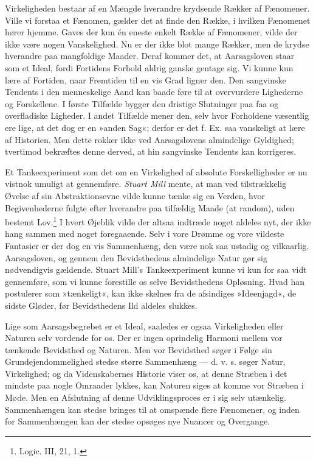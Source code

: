 \documentclass[12pt,a4paper,openany]{book}
\newcommand{\opage}[1]{\marginnote{\footnotesize\textit{[#1]}}}
\begin{document}
Virkeligheden bestaar af en Mængde hverandre krydsende Rækker af
Fænomener. Ville vi forstaa et Fænomen, gælder det at finde den Række, i
hvilken Fænomenet hører hjemme. Gaves der kun én eneste enkelt Række af
Fænomener, vilde der ikke være nogen Vanskelighed. Nu er der ikke blot
mange Rækker, men de krydse hverandre paa mangfoldige Maader. Deraf
kommer det, at Aarsagsloven staar som et Ideal, fordi Fortidens Forhold
aldrig ganske gentage sig. Vi kunne kun lære af Fortiden, naar Fremtiden
til en vis Grad ligner den. Den sangvinske Tendents i den menneskelige
Aand kan baade føre til at overvurdere Lighederne og Forskellene. I
første Tilfælde bygger den dristige Slutninger paa faa og overfladiske
Ligheder. I andet Tilfælde mener den, selv hvor Forholdene væsentlig ere
lige, at det dog er en »anden Sag«; derfor er det f. Ex. saa vanskeligt
at lære af Historien. Men dette rokker ikke ved Aarsagslovens
almindelige Gyldighed; tvertimod bekræftes denne derved, at hin
sangvinske Tendents kan korrigeres.


\opage{260}Et Tankeexperiment som det om en Virkelighed af absolute
Forskelligheder er nu vistnok umuligt at gennemføre. \emph{Stuart Mill}
mente, at man ved tilstrækkelig Øvelse af sin Abstraktionsevne vilde
kunne tænke sig en Verden, hvor Begivenhederne fulgte efter hverandre
paa tilfældig Maade (at random), uden bestemt Lov.\footnote[1]{Logic.
III, 21, 1.} I hvert Øjeblik vilde der altsaa indtræde noget aldeles
nyt, der ikke hang sammen med noget foregaaende. Selv i vore Drømme og
vore vildeste Fantasier er der dog en vis Sammenhæng, den være nok saa
ustadig og vilkaarlig. Aarsagsloven, og gennem den Bevidsthedens
almindelige Natur gør sig nødvendigvis gældende. Stuart Mill’s
Tankeexperiment kunne vi kun for saa vidt gennemføre, som vi kunne
forestille os selve Bevidsthedens Opløsning. Hvad han postulerer som
»tænkeligt«, kan ikke skelnes fra de afsindiges »Ideenjagd«, de sidste
Gløder, før Bevidsthedens Ild aldeles slukkes.

Lige som Aarsagsbegrebet er et Ideal, saaledes er ogsaa Virkeligheden
eller Naturen selv vordende for os. Der er ingen oprindelig Harmoni
mellem vor tænkende Bevidsthed og Naturen. Men vor Bevidsthed søger i
Følge sin Grundejendommelighed stedse større Sammenhæng --- d. v. s.
søger Natur, Virkelighed; og da Videnskabernes Historie viser os, at
denne Stræben i det mindste paa nogle Omraader lykkes, kan Naturen siges
at komme vor Stræben i Møde. Men en Afslutning af denne Udviklingsproces
er i sig selv utænkelig. Sammenhængen kan stedse bringes til at omspænde
flere Fænomener, og inden for Sammenhængen kan der stedse opsøges nye
Nuancer og Overgange.
\end{document}
